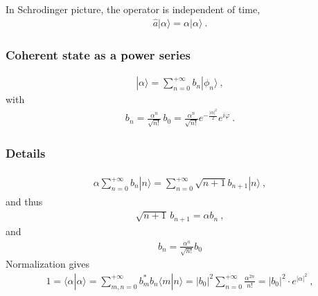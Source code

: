 \documentclass[letterpaper,10pt,english]{jupyterBook}
\begin{document}
\sphinxAtStartPar
{} In Schrodinger picture, the operator is independent of time,
\begin{equation*}
\begin{split}\hat{a} | \alpha \rangle = \alpha | \alpha \rangle \ .\end{split}
\end{equation*}\subsubsection*{Coherent state as a power series}
\begin{equation*}
\begin{split}| \alpha \rangle = \sum_{n=0}^{+\infty} b_n | \phi_n \rangle \ ,\end{split}
\end{equation*}
\sphinxAtStartPar
with
\begin{equation*}
\begin{split}b_n = \frac{\alpha^n}{\sqrt{n!}} \, b_0 =  \frac{\alpha^n}{\sqrt{n!}} e^{- \frac{|\alpha|^2}{2}} e^{i \varphi}  \ .\end{split}
\end{equation*}\subsubsection*{Details}
\begin{equation*}
\begin{split}\begin{aligned}
 \alpha \sum_{n=0}^{+\infty} b_n | n \rangle = \sum_{n=0}^{+\infty} \sqrt{n+1} b_{n+1} | n \rangle \ ,
\end{aligned}\end{split}
\end{equation*}
\sphinxAtStartPar
and thus
\begin{equation*}
\begin{split}\sqrt{n+1} \, b_{n+1} = \alpha b_n \ ,\end{split}
\end{equation*}
\sphinxAtStartPar
and
\begin{equation*}
\begin{split}b_{n} = \frac{\alpha^n}{\sqrt{n!}} b_0\end{split}
\end{equation*}
\sphinxAtStartPar
Normalization gives
\begin{equation*}
\begin{split}1 = \langle \alpha | \alpha \rangle = \sum_{m,n=0}^{+\infty} b_m^* b_n \langle m | n \rangle = |b_0|^2 \sum_{n=0}^{+\infty} \frac{\alpha^{2n}}{n!} = |b_0|^2 \cdot e^{|\alpha|^2} \ ,\end{split}
\end{equation*}
\end{document}
